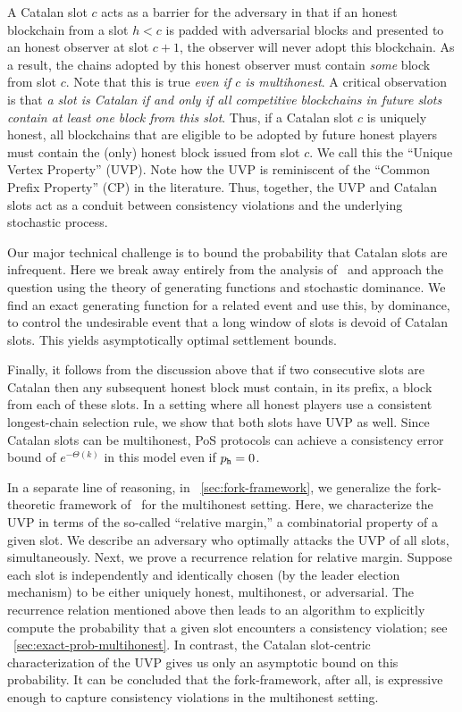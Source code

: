 A Catalan slot $c$ acts as a barrier for the adversary in that if an
honest blockchain from a slot $h < c$ is padded with adversarial
blocks and presented to an honest observer at slot $c + 1$, the
observer will never adopt this blockchain.  As a result, the chains
adopted by this honest observer must contain \emph{some} block from
slot $c$.  Note that this is true \emph{even if $c$ is
  multihonest}.  A critical observation is that \emph{a slot is
  Catalan if and only if all competitive blockchains in future slots
  contain at least one block from this slot}.  Thus, if a Catalan slot
$c$ is uniquely honest, all blockchains that are eligible to be
adopted by future honest players must contain the (only) honest block
issued from slot $c$.  We call this the ``Unique Vertex Property''
(UVP).  Note how the UVP is reminiscent of the ``Common Prefix
Property'' (CP) in the literature. Thus, together, the UVP and 
Catalan slots act as a conduit between consistency
violations and the underlying stochastic process. 

Our major technical challenge is to bound the probability that Catalan
slots are infrequent. Here we break away entirely from the analysis
of~\cite{SnowWhite} and approach the question using the theory of
generating functions and stochastic dominance. We find an exact
generating function for a related event and use this, by dominance, to
control the undesirable event that a long window of slots is devoid of
Catalan slots. This yields
asymptotically optimal settlement bounds.

Finally, it follows from the discussion above that if two consecutive
slots are Catalan then any subsequent honest block must contain, in
its prefix, a block from each of these slots.  In a setting where all
honest players use a consistent longest-chain selection rule,
we show that both slots have UVP as well.  Since Catalan slots can be
multihonest, PoS protocols can achieve a consistency error bound
of $e^{-\Theta(k)}$ in this model even if $p_{\mathtt{h}} = 0$.

In a separate line of reasoning, in \Section~\ref{sec:fork-framework}, 
we generalize the fork-theoretic framework of~\citet{LinearConsistency} for the multihonest setting. 
Here, we characterize the UVP 
in terms of the so-called ``relative margin,'' 
a combinatorial property of a given slot. 
We describe an adversary who optimally attacks the UVP 
of all slots, simultaneously. 
Next, we prove a recurrence relation for relative margin. 
Suppose each slot is 
independently and identically chosen 
(by the leader election mechanism) 
to be either uniquely honest, multihonest, or adversarial. 
The recurrence relation mentioned above then 
leads to an algorithm to explicitly compute 
the probability that 
a given slot encounters a consistency violation; 
see \Section~\ref{sec:exact-prob-multihonest}. 
In contrast, the Catalan slot-centric characterization of the UVP 
gives us only an asymptotic bound on this probability. 
It can be concluded that the fork-framework, after all, 
is expressive enough to capture consistency violations 
in the multihonest setting.


